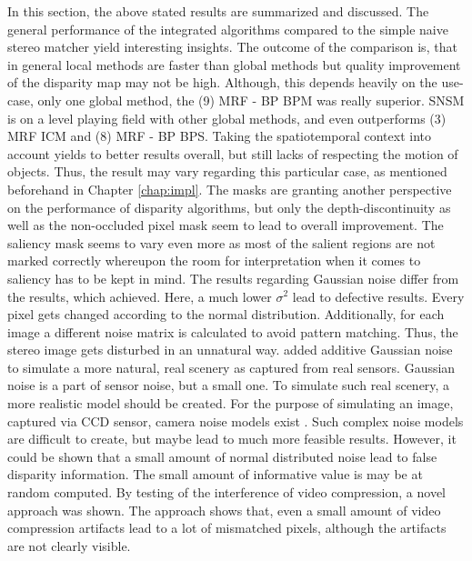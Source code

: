 In this section, the above stated results are summarized and discussed.
The general performance of the integrated algorithms compared to the simple naive stereo matcher yield interesting insights.
The outcome of the comparison is, that in general local methods are faster than global methods but quality improvement of the disparity map may not be high.
Although, this depends heavily on the use-case, only one global method, the (9) MRF - BP BPM was really superior.
SNSM is on a level playing field with other global methods, and even outperforms (3) MRF ICM and (8) MRF - BP BPS.
Taking the spatiotemporal context into account yields to better results overall, but still lacks of respecting the motion of objects.
Thus, the result may vary regarding this particular case, as mentioned beforehand in Chapter \ref{chap:impl}.
The masks are granting another perspective on the performance of disparity algorithms, but only the depth-discontinuity as well as the non-occluded pixel mask seem to lead to overall improvement.
The saliency mask seems to vary even more as most of the salient regions are not marked correctly whereupon the room for interpretation when it comes to saliency has to be kept in mind.
\newline\newline\noindent The results regarding Gaussian noise differ from the results, which \citeauthor{richardt2010real} \citep{richardt2010real} achieved.
Here, a much lower $\sigma^2$ lead to defective results.
Every pixel gets changed according to the normal distribution.
Additionally, for each image a different noise matrix is calculated to avoid pattern matching.
Thus, the stereo image gets disturbed in an unnatural way.
\citeauthor{richardt2010real} added additive Gaussian noise to simulate a more natural, real scenery as captured from real sensors.
Gaussian noise is a part of sensor noise, but a small one.
To simulate such real scenery, a more realistic model should be created.
For the purpose of simulating an image, captured via CCD sensor, camera noise models exist \citep{liu2006noise}.
Such complex noise models are difficult to create, but maybe lead to much more feasible results.
However, it could be shown that a small amount of normal distributed noise lead to false disparity information.
The small amount of informative value is may be at random computed.
\newline\newline\noindent By testing of the interference of video compression, a novel approach was shown.
The approach shows that, even a small amount of video compression artifacts lead to a lot of mismatched pixels, although the artifacts are not clearly visible.
